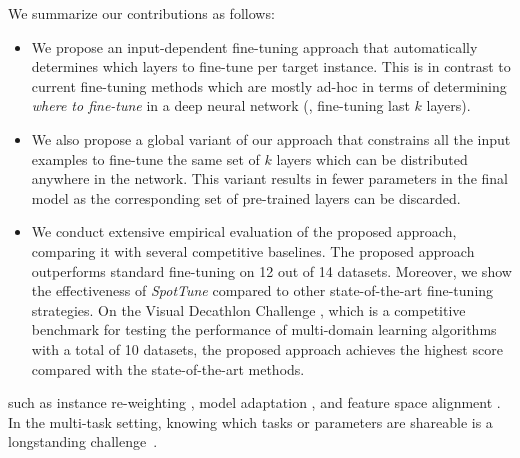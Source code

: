 \documentclass[10pt,twocolumn,letterpaper]{article}
\begin{document}
We summarize our contributions as follows: 
\begin{itemize}
\item We propose an input-dependent fine-tuning approach that automatically determines which layers to fine-tune per target instance. This is in contrast to current fine-tuning methods which are mostly ad-hoc in terms of determining {\em where to fine-tune} in a deep neural network  (\eg, fine-tuning last $k$ layers). 
\item We also propose a global variant of our approach that constrains all the input examples to fine-tune the same set of $k$ layers which can be distributed anywhere in the network. This variant results in fewer parameters in the final model as the corresponding set of pre-trained layers can be discarded.  
\item We conduct extensive empirical evaluation of the proposed approach, comparing it with several competitive baselines. The proposed approach outperforms standard fine-tuning on 12 out of 14 datasets. Moreover, we show the effectiveness of \emph{SpotTune} compared to other state-of-the-art fine-tuning strategies. On the Visual Decathlon Challenge \cite{rebuffi2017learning}, which is a competitive benchmark for testing the performance of multi-domain learning algorithms with a total of 10 datasets, the proposed approach achieves the highest score compared with the state-of-the-art methods.
\end{itemize}%
such as instance re-weighting \cite{tradaboost, dudik2006correcting}, model adaptation \cite{duan2009domain,yang2007cross}, and feature space alignment \cite{sun2016return,mirrashed2013domain,gong2012geodesic}. In the multi-task setting, knowing which tasks or parameters are shareable is a longstanding challenge~\cite{kang2011learning,kumar2012learning,thrun1998clustering,lu2017fully}.
\end{document}
